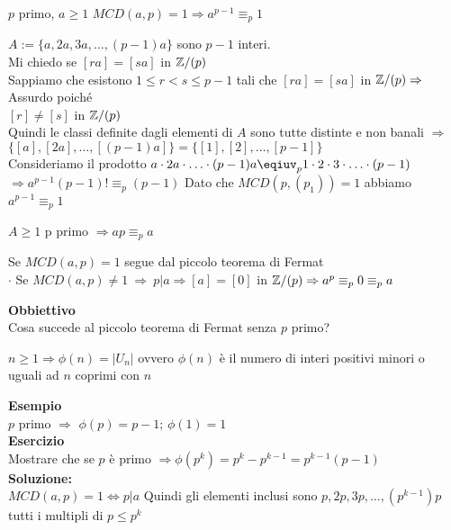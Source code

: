 \documentclass[12px]{article}
\begin{document}
{\begin{teo}
	$p$ primo, $a\geq 1$  $MCD(a,p) = 1 \Rightarrow a^{p-1}\equiv_p 1$
\end{teo}
\begin{dimo}
	$A:=\{a,2a,3a,\ldots,(p-1)a\}$ sono $p-1$ interi.\\
	Mi chiedo se $[ra] = [sa]$ in $\mathbb{Z}/(p)$\\
	Sappiamo che esistono  $1\leq r < s \leq p-1$ tali che  $[ra] = [sa]$ in $\mathbb{Z}/(p) \Rightarrow $ Assurdo poiché \\
	$[r]\neq [s]$ in $\mathbb{Z}/(p)$\\
	Quindi le classi  definite dagli elementi di $A$ sono tutte distinte e non banali $ \Rightarrow $ $\{[a],[2a], \ldots, [(p-1)a]\} = \{[1],[2],\ldots,[p-1]\}$\\
	Consideriamo il prodotto  $a\cdot 2a\cdot\ldots\cdot (p-1)a\eqiuv_p 1\cdot 2 \cdot 3 \cdot \ldots \cdot (p-1)$\\
	$ \Rightarrow a^{p-1}(p-1)!\equiv_p (p-1)$ Dato che $MCD(p,(p_1)) = 1$ abbiamo $a^{p-1}\equiv_p 1$
\end{dimo}
	 \begin{coro}
		$A\geq 1 $ p primo $ \Rightarrow ap \equiv_p a$ \\
	\end{coro}
	\begin{dimo}
		Se $MCD(a,p) = 1 $ segue dal piccolo teorema di Fermat\\
		$\cdot$ Se  $MCD(a,p)\neq 1 \ \Rightarrow  \ p|a \Rightarrow [a] = [0] $  in $\mathbb{Z}/(p) \Rightarrow a^p\equiv_p 0\equiv_p a$ \\
	\end{dimo}
	\textbf{Obbiettivo}\\
	Cosa succede al piccolo teorema di Fermat senza $p$ primo?
	\begin{defi}
		$n\geq 1 \Rightarrow \phi(n) = |U_n|$ ovvero $\phi(n)$ è il numero di interi positivi minori o uguali ad  $n$ coprimi con $n$
	\end{defi}
	\textbf{Esempio}\\
	$p$ primo $ \Rightarrow $  $\phi(p) = p-1$;  $\phi (1) = 1$\\
	 \textbf{Esercizio}\\
	 Mostrare che se $ p $ è primo $ \Rightarrow  \phi (p^k) = p^k - p^{k-1} = p^{k-1}(p-1)$ \\
	 \textbf{Soluzione:}\\
	 $MCD(a,p) = 1 \Leftrightarrow p | a$ Quindi gli elementi inclusi sono $p,2p,3p,\ldots, (p^{k-1})p $ tutti i multipli di $p \leq p^k$\\
}
\end{document}

